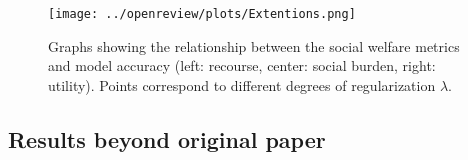 \begin{figure}
    \centering
    \hspace*{-.5in}
    \texttt{[image: ../openreview/plots/Extentions.png]}
    \caption{Graphs showing the relationship between the social welfare metrics and model accuracy (left: recourse, center: social burden, right: utility). Points correspond 
    to different degrees of regularization $\lambda$. }
    \label{fig:extention_results}
\end{figure}


    
\subsection{Results beyond original paper}

